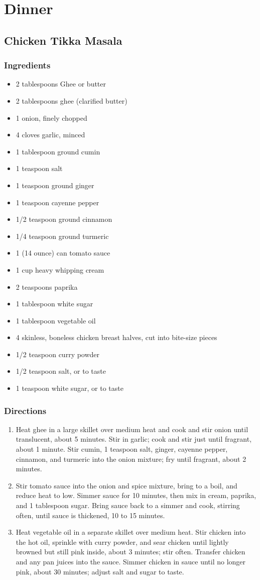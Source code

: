\documentclass[oneside,11pt]{book}
\newcommand{\Ingredients}[1]{
    \subsection*{Ingredients}
    \begin{itemize} 
        #1 
    \end{itemize}
}
\newcommand{\Directions}[1]{
    \subsection*{Directions}
    \begin{enumerate} 
        #1 
    \end{enumerate}
}
\newcommand{\recipe}[3]{
	\pagebreak
    \section*{ \hspace{-12pt} #1 }
    \addcontentsline{toc}{section}{ \hspace{-6pt} #1 }
	
	\begin{minipage}[t]{0.35\textwidth}
	    #2
	\end{minipage}
	\hspace{0.05\textwidth}
	\begin{minipage}[t]{0.6\textwidth}
	    #3
	\end{minipage}
}
\begin{document}
\chapter{Dinner}
    \recipe{Chicken Tikka Masala}{
        \Ingredients{
            \item 2 tablespoons Ghee or butter
            \item 2 tablespoons ghee (clarified butter)
            \item 1 onion, finely chopped
            \item 4 cloves garlic, minced
            \item 1 tablespoon ground cumin
            \item 1 teaspoon salt
            \item 1 teaspoon ground ginger
            \item 1 teaspoon cayenne pepper
            \item 1/2 teaspoon ground cinnamon
            \item 1/4 teaspoon ground turmeric
            \item 1 (14 ounce) can tomato sauce
            \item 1 cup heavy whipping cream
            \item 2 teaspoons paprika
            \item 1 tablespoon white sugar
            \item 1 tablespoon vegetable oil
            \item 4 skinless, boneless chicken breast halves, cut into bite-size pieces
            \item 1/2 teaspoon curry powder
            \item 1/2 teaspoon salt, or to taste
            \item 1 teaspoon white sugar, or to taste
        }
	}{
        \Directions{
            \item Heat ghee in a large skillet over medium heat and cook and stir onion until translucent, about 5 minutes. 
                Stir in garlic; cook and stir just until fragrant, about 1 minute. 
                Stir cumin, 1 teaspoon salt, ginger, cayenne pepper, cinnamon, and turmeric into the onion mixture; 
                fry until fragrant, about 2 minutes.
            \item Stir tomato sauce into the onion and spice mixture, bring to a boil, and reduce heat to low.
                Simmer sauce for 10 minutes, then mix in cream, paprika, and 1 tablespoon sugar. 
                Bring sauce back to a simmer and cook, stirring often, until sauce is thickened, 10 to 15 minutes.
            \item Heat vegetable oil in a separate skillet over medium heat. 
                Stir chicken into the hot oil, sprinkle with curry powder, and sear chicken until lightly browned but still pink inside, about 3 minutes; stir often. 
                Transfer chicken and any pan juices into the sauce. 
                Simmer chicken in sauce until no longer pink, about 30 minutes; adjust salt and sugar to taste.
        }
	}
	
\end{document}

